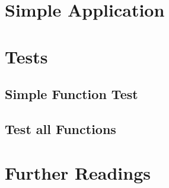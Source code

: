 \section{Simple Application}



\section{Tests}

\subsection{Simple Function Test}

\subsection{Test all Functions}



\section{Further Readings}




